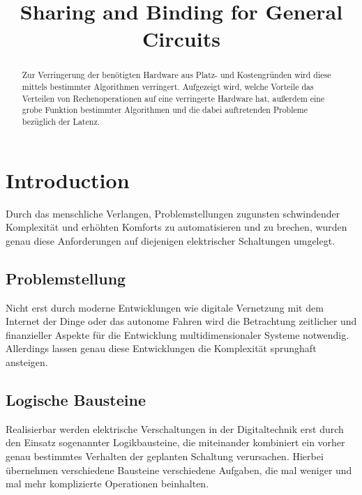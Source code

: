 \documentclass[conference]{IEEEtran}
\begin{document}
\begin{titlepage}

\title{Sharing and Binding for General Circuits\\}

\author{
}
\maketitle
\begin{abstract}
Zur Verringerung der benötigten Hardware aus Platz- und Kostengründen wird diese mittels bestimmter Algorithmen verringert.
Aufgezeigt wird, welche Vorteile das Verteilen von Rechenoperationen auf eine verringerte Hardware hat, außerdem eine grobe
Funktion bestimmter Algorithmen und die dabei auftretenden Probleme bezüglich der Latenz.
\end{abstract}
\end{titlepage}


\newpage
\section{Introduction}
Durch das menschliche Verlangen, Problemstellungen zugunsten schwindender Komplexität und erhöhten Komforts zu automatisieren und zu brechen, wurden genau diese Anforderungen auf diejenigen elektrischer Schaltungen umgelegt. 
\subsection{Problemstellung}
Nicht erst durch moderne Entwicklungen wie digitale Vernetzung mit dem Internet der Dinge oder das autonome Fahren wird die Betrachtung zeitlicher und finanzieller Aspekte für die Entwicklung multidimensionaler Systeme notwendig. Allerdings lassen genau diese Entwicklungen die Komplexität sprunghaft ansteigen.

\subsection{Logische Bausteine}
Realisierbar werden elektrische Verschaltungen in der Digitaltechnik erst durch den Einsatz sogenannter Logikbausteine, die miteinander kombiniert ein vorher genau bestimmtes Verhalten der geplanten Schaltung verursachen.
Hierbei übernehmen verschiedene Bausteine verschiedene Aufgaben, die mal weniger und mal mehr komplizierte Operationen beinhalten. 
\end{document}

